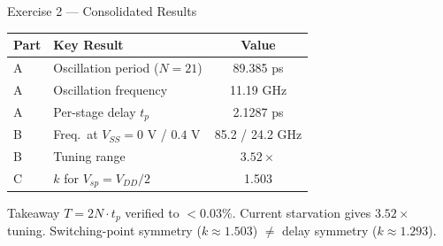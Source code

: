\documentclass[aspectratio=169, 11pt]{beamer}
\begin{document}
\begin{frame}{Exercise 2 — Consolidated Results}
    \centering
    \begin{table}
        \centering\small
        \begin{tabular}{@{}llc@{}}
            \toprule
            \textbf{Part} & \textbf{Key Result} & \textbf{Value} \\
            \midrule
            A & Oscillation period ($N = 21$) & 89.385 ps \\
            A & Oscillation frequency & 11.19 GHz \\
            A & Per-stage delay $t_p$ & 2.1287 ps \\
            \midrule
            B & Freq.\ at $V_{SS} = 0$ V / $0.4$ V & 85.2 / 24.2 GHz \\
            B & Tuning range & $3.52\times$ \\
            \midrule
            C & $k$ for $V_{sp} = V_{DD}/2$ & 1.503 \\
            \bottomrule
        \end{tabular}
    \end{table}
    \vspace{0.3em}
    \begin{alertblock}{Takeaway}
        $T = 2N \cdot t_p$ verified to $< 0.03\%$. Current starvation gives $3.52\times$ tuning. Switching-point symmetry ($k \approx 1.503$) $\neq$ delay symmetry ($k \approx 1.293$).
    \end{alertblock}
\end{frame}

\end{document}
